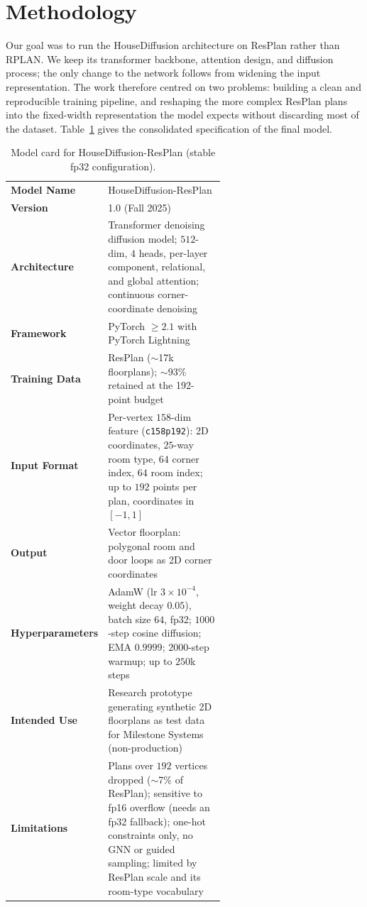 \section{Methodology}
\label{method}
Our goal was to run the HouseDiffusion architecture \cite{HouseDiffusion} on
ResPlan rather than RPLAN. We keep its transformer backbone, attention design, and
diffusion process; the only change to the network follows from widening the input
representation. The work therefore centred on two problems: building a clean and
reproducible training pipeline, and reshaping the more complex ResPlan plans into
the fixed-width representation the model expects without discarding most of the
dataset.
Table~\ref{tab:model_card} gives the consolidated specification of the final
model.

\begin{table}[t]
  \centering
  \small
  \setlength{\tabcolsep}{4pt}
  \renewcommand{\arraystretch}{1.15}
  \begin{tabular}{@{}>{\bfseries}l p{0.60\linewidth}@{}}
    \toprule
    Model Name & HouseDiffusion-ResPlan \\
    Version & 1.0 (Fall 2025) \\
    Architecture & Transformer denoising diffusion model; $512$-dim, $4$ heads,
      per-layer component, relational, and global attention; continuous
      corner-coordinate denoising \\
    Framework & PyTorch $\geq 2.1$ with PyTorch Lightning \\
    Training Data & ResPlan ($\sim$17k floorplans); $\sim$93\% retained at the
      192-point budget \\
    Input Format & Per-vertex $158$-dim feature (\texttt{c158p192}): 2D
      coordinates, $25$-way room type, $64$ corner index, $64$ room index; up
      to $192$ points per plan, coordinates in $[-1,1]$ \\
    Output & Vector floorplan: polygonal room and door loops as 2D corner
      coordinates \\
    Hyperparameters & AdamW (lr $3\times10^{-4}$, weight decay $0.05$), batch
      size $64$, fp32; $1000$-step cosine diffusion; EMA $0.9999$; $2000$-step
      warmup; up to $250$k steps \\
    Intended Use & Research prototype generating synthetic 2D floorplans as test
      data for Milestone Systems (non-production) \\
    Limitations & Plans over $192$ vertices dropped ($\sim$7\% of ResPlan);
      sensitive to fp16 overflow (needs an fp32 fallback); one-hot constraints
      only, no GNN or guided sampling; limited by ResPlan scale and its
      room-type vocabulary \\
    \bottomrule
  \end{tabular}
  \caption{Model card for HouseDiffusion-ResPlan (stable fp32 configuration).}
  \label{tab:model_card}
\end{table}

